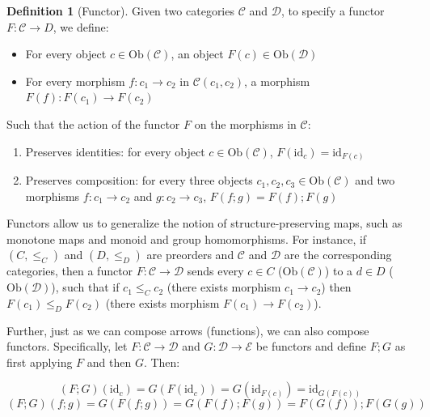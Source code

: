 \documentclass[
  openany]{book}
\providecommand{\tightlist}{%
  \setlength{\itemsep}{0pt}\setlength{\parskip}{0pt}}
\theoremstyle{definition}
\newtheorem{definition}{Definition}[chapter]
\theoremstyle{definition}
\theoremstyle{definition}
\theoremstyle{definition}
\theoremstyle{remark}
\begin{document}
\begin{definition}[Functor]

Given two categories \(\mathcal{C}\) and \(\mathcal{D}\), to specify a functor \(F: \mathcal{C} \to D\), we define:

\begin{itemize}
\tightlist
\item
  For every object \(c \in \text{Ob}(\mathcal{C})\), an object \(F(c) \in \text{Ob}(\mathcal{D})\)
\item
  For every morphism \(f: c_1 \to c_2\) in \(\mathcal{C}(c_1, c_2)\), a morphism \(F(f): F(c_1) \to F(c_2)\)
\end{itemize}

Such that the action of the functor \(F\) on the morphisms in \(\mathcal{C}\):

\begin{enumerate}
\def\labelenumi{\arabic{enumi}.}
\tightlist
\item
  Preserves identities: for every object \(c \in \text{Ob}(\mathcal{C})\), \(F(\text{id}_c) = \text{id}_{F(c)}\)
\item
  Preserves composition: for every three objects \(c_1, c_2, c_3 \in \text{Ob}(\mathcal{C})\) and two morphisms \(f: c_1 \to c_2\) and \(g: c_2 \to c_3\), \(F(f ;g) = F(f) ;F(g)\)
\end{enumerate}

\end{definition}

Functors allow us to generalize the notion of structure-preserving maps, such as monotone maps and monoid and group homomorphisms. For instance, if \((C, \leq_C)\) and \((D, \leq_D)\) are preorders and \(\mathcal{C}\) and \(\mathcal{D}\) are the corresponding categories, then a functor \(F: \mathcal{C} \to \mathcal{D}\) sends every \(c \in C\) (\(\text{Ob}(\mathcal{C})\)) to a \(d \in D\) (\(\text{Ob}(\mathcal{D})\)), such that if \(c_1 \leq_{C} c_2\) (there exists morphism \(c_1 \to c_2\)) then \(F(c_1) \leq_{D} F(c_2)\) (there exists morphism \(F(c_1) \to F(c_2)\)).

Further, just as we can compose arrows (functions), we can also compose functors. Specifically, let \(F: \mathcal{C} \to \mathcal{D}\) and \(G: \mathcal{D} \to \mathcal{E}\) be functors and define \(F ;G\) as first applying \(F\) and then \(G\). Then:

\[(F ;G)(\text{id}_c) = G(F(\text{id}_c)) = G(\text{id}_{F(c)}) = \text{id}_{G(F(c))}\]
\[(F ;G)(f ;g) = G(F(f ;g)) = G(F(f) ;F(g)) = F(G(f)) ;F(G(g))\]
\end{document}

